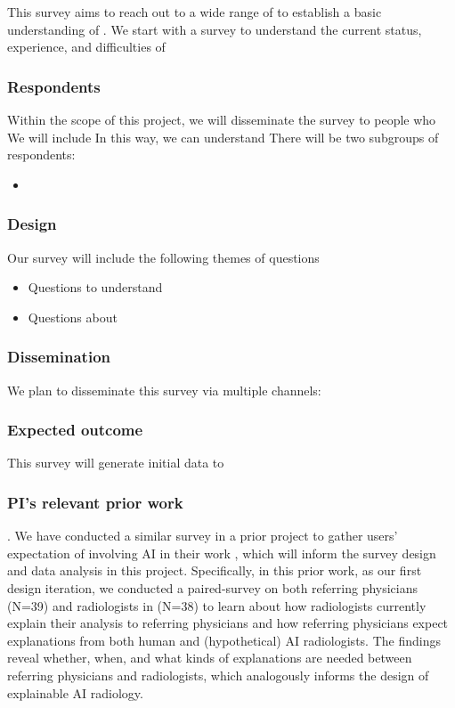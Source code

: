This survey aims to reach out to a wide range of \xx to establish a basic understanding of \xx.
We start with a survey to understand the current status, experience, and difficulties of

\subsubsection{Respondents}
Within the scope of this project, we will disseminate the survey to people who \xx
We will include \xx %
In this way, we can understand \xx
There will be two subgroups of respondents:
\begin{itemize} [leftmargin=0.25in]
    \item \xx
\end{itemize}    

\subsubsection*{Design}
Our survey will include the following themes of questions

\begin{itemize} [leftmargin=0.25in]
    \item Questions to understand \xx
    \item Questions about \xx
\end{itemize}

\subsubsection*{Dissemination}
We plan to disseminate this survey via multiple channels: \xx

\subsubsection{Expected outcome}
This survey will generate initial data to \xx 

\subsubsection*{PI's relevant prior work}.
We have conducted a similar survey in a prior project to gather users' expectation of involving AI in their work \cite{xie2020chexplain}, which will inform the survey design and data analysis in this project. Specifically, in this prior work, as our first design iteration, we conducted a paired-survey on both referring physicians (N=39) and radiologists in (N=38) to learn about how radiologists currently explain their analysis to referring physicians and how referring physicians expect explanations from both human and (hypothetical) AI radiologists. The findings reveal whether, when, and what kinds of explanations are needed between referring physicians and radiologists, which analogously informs the design of explainable AI radiology.